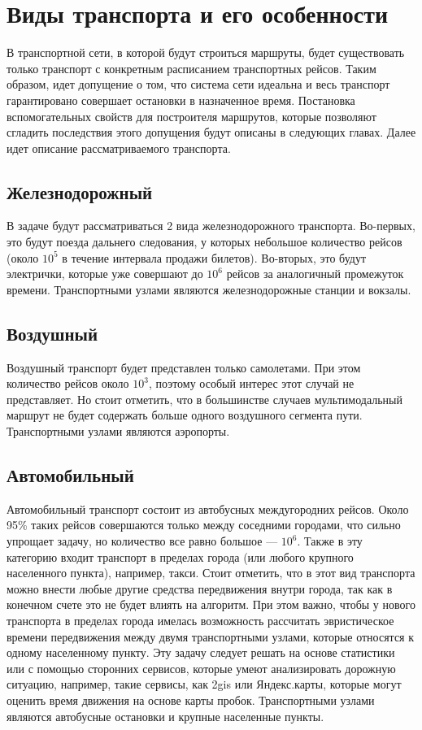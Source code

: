 \section{Виды транспорта и его особенности}
В транспортной сети, в которой будут строиться маршруты, будет существовать только транспорт с конкретным расписанием транспортных рейсов. Таким образом, идет допущение о том, что система сети идеальна и весь транспорт гарантировано совершает остановки в назначенное время. Постановка вспомогательных свойств для построителя маршрутов, которые позволяют сгладить последствия этого допущения будут описаны в следующих главах. Далее идет описание рассматриваемого транспорта.

\subsection{Железнодорожный}
В задаче будут рассматриваться 2 вида железнодорожного транспорта. Во-первых, это будут поезда дальнего следования, у которых небольшое количество рейсов (около $10^5$ в течение интервала продажи билетов). Во-вторых, это будут электрички, которые уже совершают до $10^6$ рейсов за аналогичный промежуток времени.
Транспортными узлами являются железнодорожные станции и вокзалы.

\subsection{Воздушный}
Воздушный транспорт будет представлен только самолетами. При этом количество рейсов около $10^3$, поэтому особый интерес этот случай не представляет. Но стоит отметить, что в большинстве случаев мультимодальный маршрут не будет содержать больше одного воздушного сегмента пути.
Транспортными узлами являются аэропорты.

\subsection{Автомобильный}
Автомобильный транспорт состоит из автобусных междугородних рейсов. Около 95\% таких рейсов совершаются только между соседними городами, что сильно упрощает задачу, но количество все равно большое — $10^6$.
Также в эту категорию входит транспорт в пределах города (или любого крупного населенного пункта), например, такси. Стоит отметить, что в этот вид транспорта можно внести любые другие средства передвижения внутри города, так как в конечном счете это не будет влиять на алгоритм. При этом важно, чтобы у нового транспорта в пределах города имелась возможность рассчитать эвристическое времени передвижения между двумя транспортными узлами, которые относятся к одному населенному пункту. Эту задачу следует решать на основе статистики или с помощью сторонних сервисов, которые умеют анализировать дорожную ситуацию, например, такие сервисы, как 2gis или Яндекс.карты, которые могут оценить время движения на основе карты пробок.
Транспортными узлами являются автобусные остановки и крупные населенные пункты.

